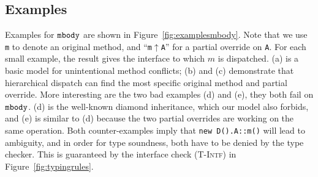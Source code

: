 \subsection{Examples}

Examples for $\texttt{mbody}$ are shown in Figure~\ref{fig:examplesmbody}. Note that we use \lstinline|m| to denote an original method, and ``\lstinline|m|$\uparrow$\lstinline|A|'' for a partial override on \lstinline|A|. For each small example, the result
gives the interface to which $m$ is dispatched. (a) is a basic model for unintentional method conflicts; (b) and (c) demonstrate
that hierarchical dispatch can find the most specific original method and partial override. More interesting are the two bad examples
(d) and (e), they both fail on $\texttt{mbody}$. (d) is the well-known diamond inheritance, which our model also forbids, and (e) is similar to
(d) because the two partial overrides are working on the same operation. Both counter-examples imply that \lstinline|new D().A::m()| will
lead to ambiguity, and in order for type soundness, both have to be denied by the type checker. This is guaranteed by the interface check
\textsc{(T-Intf)} in Figure~\ref{fig:typingrules}.
